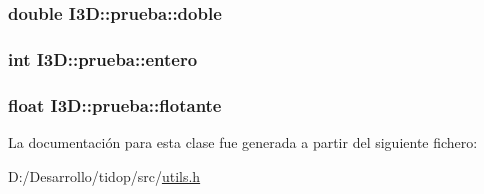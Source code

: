 \subsubsection[{\texorpdfstring{doble}{doble}}]{\setlength{\rightskip}{0pt plus 5cm}double I3\+D\+::prueba\+::doble}\hypertarget{class_i3_d_1_1prueba_a5aece7ba98b5dba226b168168f83d5cb}{}\label{class_i3_d_1_1prueba_a5aece7ba98b5dba226b168168f83d5cb}
\subsubsection[{\texorpdfstring{entero}{entero}}]{\setlength{\rightskip}{0pt plus 5cm}int I3\+D\+::prueba\+::entero}\hypertarget{class_i3_d_1_1prueba_ad53c6cddadb10b39cc031e6283a5df7a}{}\label{class_i3_d_1_1prueba_ad53c6cddadb10b39cc031e6283a5df7a}
\subsubsection[{\texorpdfstring{flotante}{flotante}}]{\setlength{\rightskip}{0pt plus 5cm}float I3\+D\+::prueba\+::flotante}\hypertarget{class_i3_d_1_1prueba_a62bdc26bc4e1fbf2338c57f430cb9757}{}\label{class_i3_d_1_1prueba_a62bdc26bc4e1fbf2338c57f430cb9757}


La documentación para esta clase fue generada a partir del siguiente fichero\+:\begin{DoxyCompactItemize}
\item 
D\+:/\+Desarrollo/tidop/src/\hyperlink{utils_8h}{utils.\+h}\end{DoxyCompactItemize}
